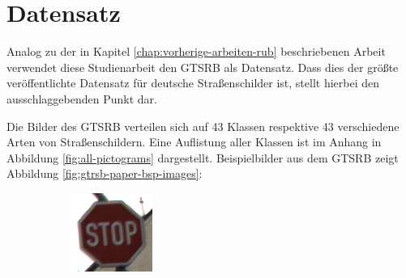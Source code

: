 \section{Datensatz}
\label{chap:3-Datensatz}
Analog zu der in Kapitel \ref{chap:vorherige-arbeiten-rub} beschriebenen Arbeit verwendet diese Studienarbeit den \ac{GTSRB} als Datensatz. Dass dies der größte veröffentlichte Datensatz für deutsche Straßenschilder ist, stellt hierbei den ausschlaggebenden Punkt dar.

Die Bilder des \ac{GTSRB} verteilen sich auf 43 Klassen respektive 43 verschiedene Arten von Straßenschildern. Eine Auflistung aller Klassen ist im Anhang in Abbildung \ref{fig:all-pictograms} dargestellt. Beispielbilder aus dem \ac{GTSRB} zeigt Abbildung \ref{fig:gtrsb-paper-bsp-images}: \cite{GTSRB}


\begin{figure}[H]
   \centering
   \begin{subfigure}[b]{0.125\textwidth}
       \centering
       \includegraphics[height=\textwidth]{../images/GTSRB/00093.png}
       \caption{}
       \label{fig:gtrsb-paper-bsp-image-1}
   \end{subfigure}
   \hspace{3em}%
   \begin{subfigure}[b]{0.125\textwidth}
       \centering

\end{subfigure}
\end{figure}
